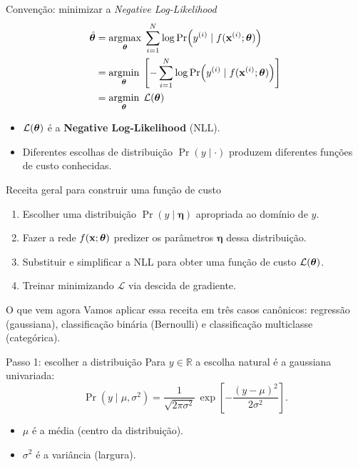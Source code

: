 \documentclass[aspectratio=169,xcolor=dvipsnames]{beamer}
\begin{document}
  \begin{frame}{Convenção: minimizar a \textit{Negative Log-Likelihood}}
    \begin{align*}
      \hat{\bm{\theta}}
        &= \operatorname*{argmax}_{\bm{\theta}}\;\sum_{i=1}^{N}\log\Pr\!\left(y^{(i)} \mid f(\mathbf{x}^{(i)};\bm{\theta})\right) \\
        &= \operatorname*{argmin}_{\bm{\theta}}\;\left[-\sum_{i=1}^{N}\log\Pr\!\left(y^{(i)} \mid f(\mathbf{x}^{(i)};\bm{\theta})\right)\right] \\
        &= \operatorname*{argmin}_{\bm{\theta}}\;\mathcal{L}(\bm{\theta})
    \end{align*}
    \vfill
    \begin{itemize}
      \item $\mathcal{L}(\bm{\theta})$ é a \textbf{Negative Log-Likelihood} (NLL).
      \item Diferentes escolhas de distribuição $\Pr(y\mid \cdot)$ produzem diferentes
        funções de custo conhecidas.
    \end{itemize}
  \end{frame}

  \begin{frame}{Receita geral para construir uma função de custo}
    \begin{enumerate}
      \item Escolher uma distribuição $\Pr(y\mid \bm{\eta})$ apropriada ao domínio de $y$.
      \item Fazer a rede $f(\mathbf{x};\bm{\theta})$ predizer os parâmetros $\bm{\eta}$ dessa distribuição.
      \item Substituir e simplificar a NLL para obter uma função de custo $\mathcal{L}(\bm{\theta})$.
      \item Treinar minimizando $\mathcal{L}$ via descida de gradiente.
    \end{enumerate}
    \vfill
    \begin{exampleblock}{O que vem agora}
      Vamos aplicar essa receita em três casos canônicos: regressão (gaussiana),
      classificação binária (Bernoulli) e classificação multiclasse (categórica).
    \end{exampleblock}
  \end{frame}


  \begin{frame}{Passo 1: escolher a distribuição}
    Para $y\in\mathbb{R}$ a escolha natural é a gaussiana univariada:
    \[
      \Pr(y\mid \mu,\sigma^{2}) = \frac{1}{\sqrt{2\pi\sigma^{2}}}\,
        \exp\!\left[-\frac{(y-\mu)^{2}}{2\sigma^{2}}\right].
    \]
    \begin{itemize}
      \item $\mu$ é a média (centro da distribuição).
      \item $\sigma^{2}$ é a variância (largura).
    \end{itemize}
  \end{frame}
\end{document}
